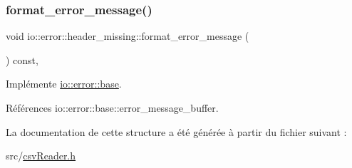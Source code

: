 \subsubsection{\texorpdfstring{format\+\_\+error\+\_\+message()}{format\_error\_message()}}
{\footnotesize\ttfamily void io\+::error\+::header\+\_\+missing\+::format\+\_\+error\+\_\+message (\begin{DoxyParamCaption}{ }\end{DoxyParamCaption}) const\hspace{0.3cm}{\ttfamily [inline]}, {\ttfamily [virtual]}}



Implémente \hyperlink{structio_1_1error_1_1base_a7d9ff6a31b716a24f056cf8a3e15191d}{io\+::error\+::base}.



Références io\+::error\+::base\+::error\+\_\+message\+\_\+buffer.



La documentation de cette structure a été générée à partir du fichier suivant \+:\begin{DoxyCompactItemize}
\item 
src/\hyperlink{csvReader_8h}{csv\+Reader.\+h}\end{DoxyCompactItemize}
